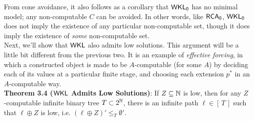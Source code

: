 \documentclass{amsart}
\begin{document}
	From cone avoidance, it also follows as a corollary that $\operatorname{\sf{WKL_0}}$ has no minimal model; any non-computable $C$ can be avoided. In other words, like $\operatorname{\sf{RCA_0}}$, $\operatorname{\sf{WKL_0}}$ does not imply the existence of any particular non-computable set, though it does imply the existence of \textit{some} non-computable set.\\
	
	Next, we'll show that $\sf{WKL}$ also admits low solutions. This argument will be a little bit different from the previous two. It is an example of \textit{effective forcing}, in which a constructed object is made to be $A$-computable (for some $A$) by deciding each of its values at a particular finite stage, and choosing each extension $p^*$ in an $A$-computable way.\\
	
	\noindent \textbf{Theorem 3.4 ($\sf{WKL}$ Admits Low Solutions)}: If $Z\subseteq \mathbb{N}$ is low, then for any $Z$-computable infinite binary tree $T\subset 2^{\mathbb{N}}$, there is an infinite path $\ell\in [\,T\,]$ such that $\ell\oplus Z$ is low, i.e. $(\ell\oplus Z)'\leq_T \emptyset'$.
	
\end{document}
